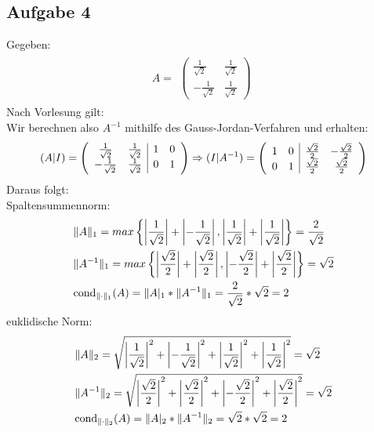 \newpage
\subsection*{Aufgabe 4}
Gegeben:
\begin{align*} \label{eq8}
A=
\begin{split}
\begin{pmatrix}
\frac{1}{\sqrt2} & \frac{1}{\sqrt2} \\
-\frac{1}{\sqrt2} &\frac{1}{\sqrt2}
\end{pmatrix}
\end{split}
\end{align*}
Nach Vorlesung gilt: \\

Wir berechnen also $A^{-1}$ mithilfe des Gauss-Jordan-Verfahren und erhalten:
\begin{align*}
(A|I)=
\begin{split}
\begin{array}({cc|cc})
\frac{1}{\sqrt2} & \frac{1}{\sqrt2} & 1 & 0 \\
-\frac{1}{\sqrt2} &\frac{1}{\sqrt2} & 0 & 1
\end{array}
\Rightarrow(I|A^{-1})=
\begin{array}({cc|cc})
 1 & 0 & \frac{\sqrt2}{2} & -\frac{\sqrt2}{2} \\
 0 & 1 & \frac{\sqrt2}{2} & \frac{\sqrt2}{2}
\end{array}
\end{split}
\end{align*}
Daraus folgt:\\
Spaltensummennorm:
\begin{align*}
\begin{split}
&\|A\|_1=max\left\lbrace \left|\frac{1}{\sqrt2}\right|+\left|-\frac{1}{\sqrt2}\right|, \left|\frac{1}{\sqrt2}\right|+\left|\frac{1}{\sqrt2}\right|\right\rbrace=\frac{2}{\sqrt2}\\
&\|A^{-1}\|_1=max\left\lbrace\left|\frac{\sqrt2}{2}\right|+\left|\frac{\sqrt2}{2}\right|, \left|-\frac{\sqrt2}{2}\right|+\left|\frac{\sqrt2}{2}\right|\right\rbrace={\sqrt2}\\
& \mathrm{cond}_{\| \cdot \|_1}(A)=\|A|_1*\|A^{-1}\|_1=\frac{2}{\sqrt2} * {\sqrt2} = 2\\
\end{split}
\end{align*}
euklidische Norm:
\begin{align*}
\begin{split}
&\|A\|_2=\sqrt{\left|\frac{1}{\sqrt2}\right|^2+\left|-\frac{1}{\sqrt2}\right|^2+\left|\frac{1}{\sqrt2}\right|^2+\left|\frac{1}{\sqrt2}\right|^2}=\sqrt{2}\\
&\|A^{-1}\|_2=\sqrt{\left|\frac{\sqrt2}{2}\right|^2+\left|\frac{\sqrt2}{2}\right|^2 + \left|-\frac{\sqrt2}{2}\right|^2 + \left|\frac{\sqrt2}{2}\right|^2}=\sqrt{2}\\
& \mathrm{cond}_{\| \cdot \|_2}(A)=\|A|_2*\|A^{-1}\|_2=\sqrt{2}*\sqrt{2}=2\\
\end{split}
\end{align*}
